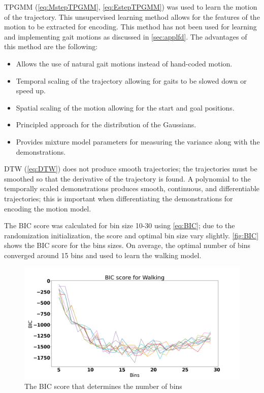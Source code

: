 TPGMM (\autoref{eq:MstepTPGMM}, \autoref{eq:EstepTPGMM}) was used to learn the motion of the trajectory. This unsupervised learning method allows for the features of the motion to be extracted for encoding. This method has not been used for learning and implementing gait motions as discussed in \autoref{sec:applfd}.  The advantages of this method are the following:

\begin{itemize}
    \item Allows the use of natural gait motions instead of hand-coded motion.
    \item Temporal scaling of the trajectory allowing for gaits to be slowed down or speed up.
    \item Spatial scaling of the motion allowing for the start and goal positions.
    \item Principled approach for the distribution of the Gaussians.
    \item Provides mixture model parameters for measuring the variance along with the demonstrations.
\end{itemize}


DTW (\autoref{eq:DTW}) does not produce smooth trajectories; the trajectories must be smoothed so that the derivative of the trajectory is found.
A polynomial to the temporally scaled demonstrations produces smooth, continuous, and differentiable trajectories; this is important when differentiating the demonstrations for encoding the motion model. 




The BIC score was calculated for bin size 10-30 using  \autoref{eq:BIC}; due to the randomization initialization, the score and optimal bin size vary slightly. \autoref{fig:BIC} shows the BIC score for the bins sizes. On average, the optimal number of bins converged around 15 bins and used to learn the walking model.    

\begin{figure}
    \centering
    \includegraphics[scale=0.3]{images/gait_data/BIC_Walk.png}
    \caption[BIC score for walking]{The BIC score that determines the number of bins}
    \label{fig:BIC}
\end{figure}

